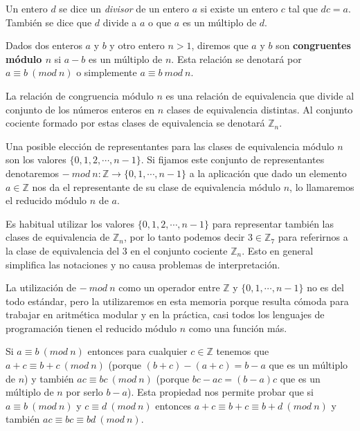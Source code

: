 \hfil

\begin{definition}
Un entero $d$ se dice un {\em divisor} de un entero $a$ si existe un entero $c$ tal
que $dc = a$. Tambi\'en se dice que $d$ divide a $a$ o que $a$ es un m\'ultiplo
de $d$.
\end{definition}

\begin{definition}
Dados dos enteros $a$ y $b$ y otro entero $n>1$, diremos que $a$ y $b$ son {\bf
congruentes m\'odulo $n$} si $a-b$ es un m\'ultiplo de $n$. Esta relaci\'on se
denotar\'a por $a \equiv b ~(mod~n)$ o simplemente $a \equiv b~mod~n$.
\end{definition}

La relaci\'on de congruencia m\'odulo $n$ es una relaci\'on de equivalencia que
divide al conjunto de los n\'umeros enteros en $n$ clases de equivalencia
distintas. Al conjunto cociente formado por estas clases de equivalencia
se denotar\'a ${\mathbb Z}_n$.

Una posible elecci\'on de representantes para las clases de
equivalencia m\'odulo $n$ son los valores $\{0,1,2,\cdots,n-1\}$.
Si fijamos este conjunto de representantes denotaremos
$- ~ mod ~ n : {\mathbb Z} \to \{0,1,\cdots,n-1\} $
a la aplicaci\'on que dado un elemento $a \in {\mathbb Z}$ nos da el representante
de su clase de equivalencia m\'odulo $n$, lo llamaremos el reducido m\'odulo $n$
de $a$.

Es habitual utilizar los valores $\{0,1,2,\cdots,n-1\}$ para representar tambi\'en
las clases de equivalencia de ${\mathbb Z}_n$, por lo tanto podemos decir $3 \in {\mathbb Z}_7$
para referirnos a la clase de equivalencia del $3$ en el conjunto cociente ${\mathbb Z}_n$.
Esto en general simplifica las notaciones y no causa problemas de interpretaci\'on.

La utilizaci\'on de $-~mod~n$ como un operador entre ${\mathbb Z}$ y $\{0,1,\cdots,n-1\}$
no es del todo est\'andar, pero la utilizaremos en esta memoria porque resulta c\'omoda
para trabajar en aritm\'etica modular y en la pr\'actica, casi todos los lenguajes de
programaci\'on tienen el reducido m\'odulo $n$ como una funci\'on m\'as.

Si $a \equiv b ~(mod~n)$ entonces para cualquier $c \in {\mathbb Z}$ tenemos que
$a + c \equiv b + c ~(mod~n)$ (porque $(b+c)-(a+c) = b-a$ que es un m\'ultiplo de $n$)
y tambi\'en $ac \equiv bc ~(mod~n)$ (porque $bc-ac=(b-a)c$ que es un m\'ultiplo de
$n$ por serlo $b-a$). Esta propiedad nos permite probar que si $a \equiv b~(mod~n)$
y $c \equiv d~(mod~n)$ entonces $a+c \equiv b+c \equiv b+d ~(mod~n)$ y tambi\'en
$ac \equiv bc \equiv bd~(mod~n)$.


